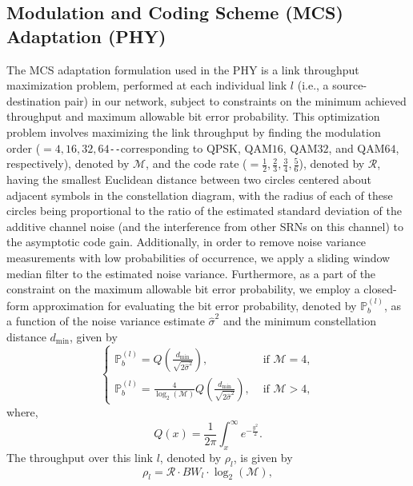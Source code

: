 \subsection{Modulation and Coding Scheme (MCS) Adaptation (PHY)}\label{B.I.IV}
The MCS adaptation formulation used in the PHY is a link throughput maximization problem, performed at each individual link $l$ (i.e., a source-destination pair) in our network, subject to constraints on the minimum achieved throughput and maximum allowable bit error probability. This optimization problem involves maximizing the link throughput by finding the modulation order (${=}4,16,32,64$\texttt{-{}-}corresponding to QPSK, QAM$16$, QAM$32$, and QAM$64$, respectively), denoted by $\mathcal{M}$, and the code rate (${=}\frac{1}{2},\frac{2}{3},\frac{3}{4},\frac{5}{6}$), denoted by $\mathcal{R}$, having the smallest Euclidean distance between two circles centered about adjacent symbols in the constellation diagram, with the radius of each of these circles being proportional to the ratio of the estimated standard deviation of the additive channel noise (and the interference from other SRNs on this channel) to the asymptotic code gain. Additionally, in order to remove noise variance measurements with low probabilities of occurrence, we apply a sliding window median filter to the estimated noise variance. Furthermore, as a part of the constraint on the maximum allowable bit error probability, we employ a closed-form approximation for evaluating the bit error probability, denoted by $\mathbb{P}_{b}^{(l)}$, as a function of the noise variance estimate $\hat{\sigma}^{2}$ and the minimum constellation distance $d_{\text{min}}$, given by
\begin{equation}\label{B.4}
    \begin{cases}
        \mathbb{P}_{b}^{(l)}=Q\left(\frac{d_{\text{min}}}{\sqrt{2\hat{\sigma}^{2}}}\right),&\text{ if $\mathcal{M}=4$},\\
        \mathbb{P}_{b}^{(l)}=\frac{4}{\log_{2}(\mathcal{M})}Q\left(\frac{d_{\text{min}}}{\sqrt{2\hat{\sigma}^{2}}}\right),&\text{ if $\mathcal{M}>4$},
    \end{cases}
\end{equation}
where,
\begin{equation}\label{B.5}
    Q(x)=\frac{1}{2\pi}\int_{x}^{\infty}e^{-\frac{y^{2}}{2}}.
\end{equation}
The throughput over this link $l$, denoted by $\rho_{l}$, is given by
\begin{equation}\label{B.6}
    \rho_{l}=\mathcal{R} \cdot BW_{l} \cdot \log_{2}(\mathcal{M}),
\end{equation}
